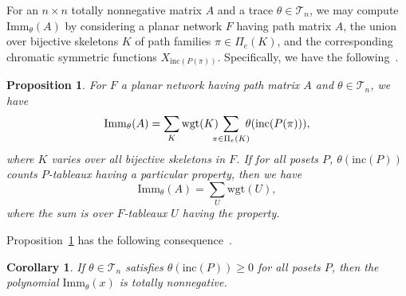 \documentclass[12pt]{amsart}
\newtheorem{prop}[thm]{Proposition}
\newtheorem{cor}[thm]{Corollary}
\numberwithin{equation}{section}
\newcommand{\imm}[1]{\mathrm{Imm}_{#1}}
\newcommand{\wgt}{\mathrm{wgt}}
\newcommand{\ntnsp}{\negthinspace}
\newcommand{\nTksp}{\negthickspace\negthickspace}
\newcommand{\inc}{\mathrm{inc}}
\newcommand{\trspace}[1]{\mathcal{T}_{#1}}
\begin{document}
For an $n \times n$ totally nonnegative matrix $A$
and a trace $\theta \in \trspace n$, 
we may compute $\imm \theta(A)$ by considering
a planar network $F$ having path matrix $A$,
the union over bijective skeletons $K$ of
path families $\pi \in \Pi_e(K)$,
and the corresponding
chromatic symmetric functions $X_{\inc(P(\pi))}$.
Specifically, we have the following~\cite[Cor.\,4.6]{SkanCCS}.
\begin{prop}\label{p:immincP}
  For $F$ a planar network having path matrix $A$ and $\theta \in \trspace n$,
  we have
\begin{equation}\label{eq:propcorcomb}
  \imm{\theta}(A) = \sum_K \wgt(K)
  \nTksp \ntnsp \sum_{\pi \in \Pi_e(K)} \nTksp \theta(\inc(P(\pi))),
\end{equation}
where $K$ varies over all bijective skeletons in $F$.  If
for all posets $P$, $\theta(\inc(P))$ counts $P$-tableaux
having a particular property,
then we have
\begin{equation}\label{eq:propcorcomb2}
  \imm{\theta}(A) = \sum_U \wgt(U),
\end{equation}
where the sum is over $F$-tableaux $U$ having the property.
\end{prop}
Proposition~\ref{p:immincP}
has the following consequence~\cite[Cor.\,4.7]{SkanCCS}.
\begin{cor}\label{c:immincP}
  If $\theta \in \trspace n$ satisfies
  $\theta(\inc(P)) \geq 0$ for all posets $P$, then
the polynomial $\imm\theta(x)$ is totally nonnegative.
\end{cor}
\end{document}
